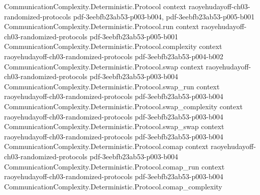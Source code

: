 \begin{theorem}
\label{CommunicationComplexity.PublicCoin.FiniteMessage.Protocol.newmanProtocol_complexity}
\leanok
{}
\proofstep
  {CommunicationComplexity.Deterministic.Protocol}
  {context}
  {raoyehudayoff-ch03-randomized-protocols}
  {pdf-3eebfb23ab53-p003-b004,
    pdf-3eebfb23ab53-p005-b001}
\proofstep
  {CommunicationComplexity.Deterministic.Protocol.run}
  {context}
  {raoyehudayoff-ch03-randomized-protocols}
  {pdf-3eebfb23ab53-p005-b001}
\proofstep
  {CommunicationComplexity.Deterministic.Protocol.complexity}
  {context}
  {raoyehudayoff-ch03-randomized-protocols}
  {pdf-3eebfb23ab53-p004-b002}
\proofstep
  {CommunicationComplexity.Deterministic.Protocol.swap}
  {context}
  {raoyehudayoff-ch03-randomized-protocols}
  {pdf-3eebfb23ab53-p003-b004}
\proofstep
  {CommunicationComplexity.Deterministic.Protocol.swap_run}
  {context}
  {raoyehudayoff-ch03-randomized-protocols}
  {pdf-3eebfb23ab53-p003-b004}
\proofstep
  {CommunicationComplexity.Deterministic.Protocol.swap_complexity}
  {context}
  {raoyehudayoff-ch03-randomized-protocols}
  {pdf-3eebfb23ab53-p003-b004}
\proofstep
  {CommunicationComplexity.Deterministic.Protocol.swap_swap}
  {context}
  {raoyehudayoff-ch03-randomized-protocols}
  {pdf-3eebfb23ab53-p003-b004}
\proofstep
  {CommunicationComplexity.Deterministic.Protocol.comap}
  {context}
  {raoyehudayoff-ch03-randomized-protocols}
  {pdf-3eebfb23ab53-p003-b004}
\proofstep
  {CommunicationComplexity.Deterministic.Protocol.comap_run}
  {context}
  {raoyehudayoff-ch03-randomized-protocols}
  {pdf-3eebfb23ab53-p003-b004}
\proofstep
  {CommunicationComplexity.Deterministic.Protocol.comap_complexity}

\end{theorem}
